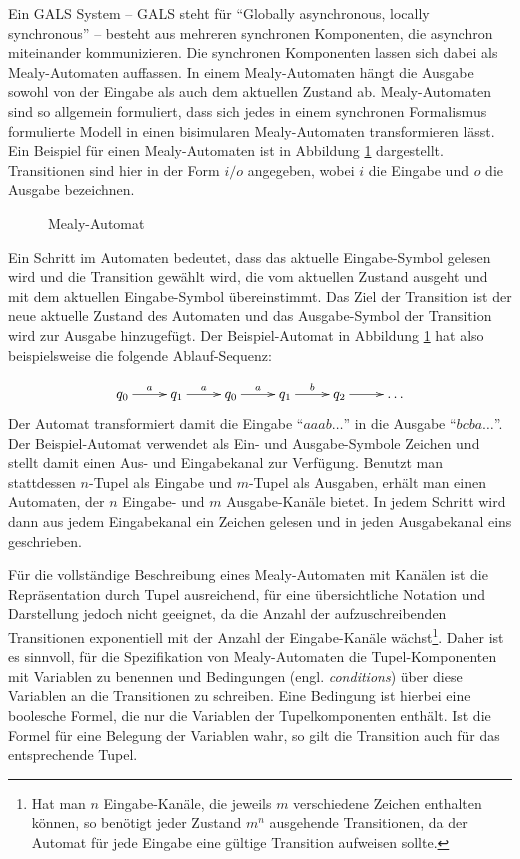 Ein GALS System -- GALS steht für "`Globally asynchronous, locally synchronous"' -- besteht aus mehreren synchronen Komponenten, die asynchron miteinander kommunizieren.
Die synchronen Komponenten lassen sich dabei als Mealy-Automaten auffassen.
In einem Mealy-Automaten hängt die Ausgabe sowohl von der Eingabe als auch dem aktuellen Zustand ab\cite{Mealy}.
Mealy-Automaten sind so allgemein formuliert, dass sich jedes in einem synchronen Formalismus formulierte Modell in einen bisimularen Mealy-Automaten transformieren lässt.
Ein Beispiel für einen Mealy-Automaten ist in Abbildung \ref{fig:mealy} dargestellt.
Transitionen sind hier in der Form $i/o$ angegeben, wobei $i$ die Eingabe und $o$ die Ausgabe bezeichnen.
\begin{figure}[h]
  \centering
  
  \caption{Mealy-Automat}
  \label{fig:mealy}
\end{figure}

Ein Schritt im Automaten bedeutet, dass das aktuelle Eingabe-Symbol gelesen wird und die Transition gewählt wird, die vom aktuellen Zustand ausgeht und mit dem aktuellen Eingabe-Symbol übereinstimmt.
Das Ziel der Transition ist der neue aktuelle Zustand des Automaten und das Ausgabe-Symbol der Transition wird zur Ausgabe hinzugefügt.
Der Beispiel-Automat in Abbildung \ref{fig:mealy} hat also beispielsweise die folgende Ablauf-Sequenz:

\[ \xymatrix {
     q_0\ar[r]^a &  q_1 \ar[r]^a & q_0 \ar[r]^a & q_1 \ar[r]^b & q_2\ar[r] & \dots
   } \]
Der Automat transformiert damit die Eingabe "`$aaab\dots$"' in die Ausgabe "`$bcba\dots$"'.
Der Beispiel-Automat verwendet als Ein- und Ausgabe-Symbole Zeichen und stellt damit einen Aus- und Eingabekanal zur Verfügung.
Benutzt man stattdessen $n$-Tupel als Eingabe und $m$-Tupel als Ausgaben, erhält man einen Automaten, der $n$ Eingabe- und $m$ Ausgabe-Kanäle bietet.
In jedem Schritt wird dann aus jedem Eingabekanal ein Zeichen gelesen und in jeden Ausgabekanal eins geschrieben.

Für die vollständige Beschreibung eines Mealy-Automaten mit Kanälen ist die Repräsentation durch Tupel ausreichend, für eine übersichtliche Notation und Darstellung jedoch nicht geeignet, da die Anzahl der aufzuschreibenden Transitionen exponentiell mit der Anzahl der Eingabe-Kanäle wächst\footnote{Hat man $n$ Eingabe-Kanäle, die jeweils $m$ verschiedene Zeichen enthalten können, so benötigt jeder Zustand $m^n$ ausgehende Transitionen, da der Automat für jede Eingabe eine gültige Transition aufweisen sollte.}.
Daher ist es sinnvoll, für die Spezifikation von Mealy-Automaten die Tupel-Komponenten mit Variablen zu benennen und Bedingungen (engl. \emph{conditions}) über diese Variablen an die Transitionen zu schreiben.
Eine Bedingung ist hierbei eine boolesche Formel, die nur die Variablen der Tupelkomponenten enthält.
Ist die Formel für eine Belegung der Variablen wahr, so gilt die Transition auch für das entsprechende Tupel.

